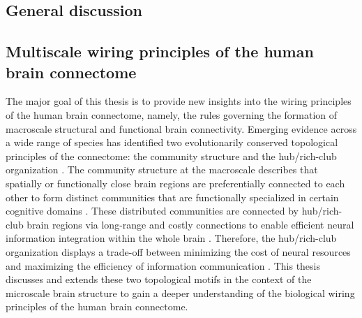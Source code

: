 \begin{refsection}
\section*{General discussion}
\subsection*{Multiscale wiring principles of the human brain connectome}
The major goal of this thesis is to provide new insights into the wiring principles of the human brain connectome, namely, the rules governing the formation of macroscale structural and functional brain connectivity. Emerging evidence across a wide range of species has identified two evolutionarily conserved topological principles of the connectome: the community structure and the hub/rich-club organization \citep{Heuvel2016ComparativeC}. The community structure at the macroscale describes that spatially or functionally close brain regions are preferentially connected to each other to form distinct communities that are functionally specialized in certain cognitive domains \citep{smith2009correspondence,Sporns2016ModularBN,Wei2017IdentifyingTM}. These distributed communities are connected by hub/rich-club brain regions via long-range and costly connections to enable efficient neural information integration within the whole brain \citep{vanDenHeuvel2012HighcostHB,Senden2014RichCO}. Therefore, the hub/rich-club organization displays a trade-off between minimizing the cost of neural resources and maximizing the efficiency of information communication \citep{bullmore_economy_2012,Heuvel2019ACC}. This thesis discusses and extends these two topological motifs in the context of the microscale brain structure to gain a deeper understanding of the biological wiring principles of the human brain connectome.


\end{refsection}
